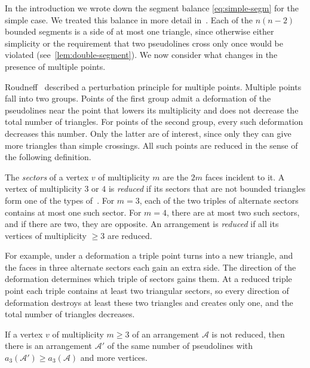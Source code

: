 In the introduction we wrote down the segment balance \eqref{eq:simple-segm} for the simple case. We treated this balance in more detail in~\cite[Subsection~2.3]{pu26b}.
Each of the $n(n-2)$ bounded segments is a side of at most one triangle,
since otherwise either simplicity or the requirement that two pseudolines cross only once would be violated (see~\cref{lem:double-segment}).
We now consider what changes in the presence of multiple points.

Roudneff~\cite{roudneff96} described a perturbation principle for multiple points.
Multiple points fall into two groups. Points of the first group admit a deformation of the pseudolines near the point that lowers its multiplicity and does not decrease the total number of triangles. For points of the second group, every such deformation decreases this number.
Only the latter are of interest, since only they can give more triangles than simple crossings.
All such points are reduced in the sense of the following definition.

\begin{definition}\label{def:reduced}
The \emph{sectors} of a vertex $v$ of multiplicity $m$ are the $2m$ faces incident to it.
A vertex of multiplicity $3$ or $4$ is \emph{reduced} if its sectors that are not bounded triangles form one of the types of~\cite[Fig.~3.5]{roudneff96}.
For $m=3$, each of the two triples of alternate sectors contains at most one such sector.
For $m=4$, there are at most two such sectors, and if there are two, they are opposite.
An arrangement is \emph{reduced} if all its vertices of multiplicity $\ge3$ are reduced.
\end{definition}

For example, under a deformation a triple point turns into a new triangle, and the faces in three alternate sectors each gain an extra side.
The direction of the deformation determines which triple of sectors gains them.
At a reduced triple point each triple contains at least two triangular sectors, so every direction of deformation destroys at least these two triangles and creates only one, and the total number of triangles decreases.

\begin{lemma}[perturbation]\label{lem:perturbation}
If a vertex $v$ of multiplicity $m\ge3$ of an arrangement $\mathcal A$ is not reduced, then there is an arrangement $\mathcal A'$ of the same number of pseudolines with $a_3(\mathcal A')\ge a_3(\mathcal A)$ and more vertices.
\end{lemma}

